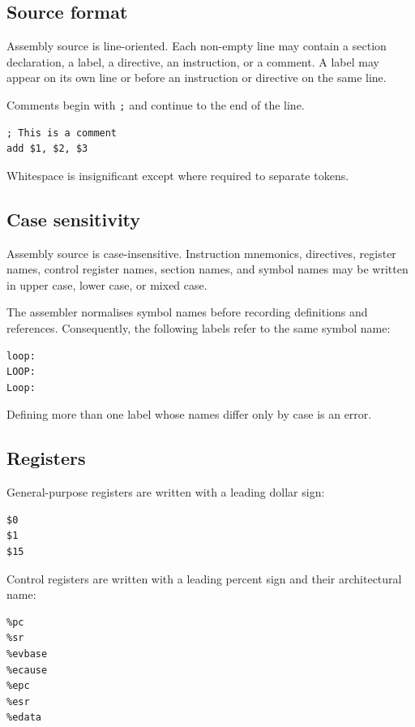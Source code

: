\subsection{Source format}

Assembly source is line-oriented. Each non-empty line may contain a section declaration,
a label, a directive, an instruction, or a comment.
A label may appear on its own line or before an instruction or directive on the same line.

Comments begin with \texttt{;} and continue to the end of the line.

\begin{verbatim}
; This is a comment
add $1, $2, $3
\end{verbatim}

Whitespace is insignificant except where required to separate tokens.

\subsection{Case sensitivity}

Assembly source is case-insensitive. Instruction mnemonics, directives, register names,
control register names, section names, and symbol names may be written in upper case,
lower case, or mixed case.

The assembler normalises symbol names before recording definitions and references.
Consequently, the following labels refer to the same symbol name:

\begin{verbatim}
loop:
LOOP:
Loop:
\end{verbatim}

Defining more than one label whose names differ only by case is an error.

\subsection{Registers}

General-purpose registers are written with a leading dollar sign:

\begin{verbatim}
$0
$1
$15
\end{verbatim}

Control registers are written with a leading percent sign and their architectural name:

\begin{verbatim}
%pc
%sr
%evbase
%ecause
%epc
%esr
%edata
\end{verbatim}

